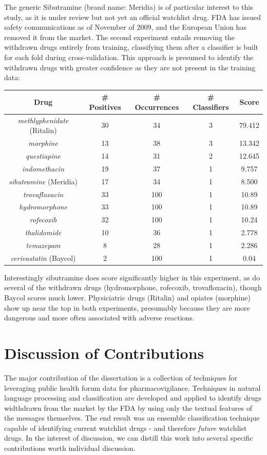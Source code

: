 \documentclass[twoside,11pt]{article}
\begin{document}
The generic Sibutramine (brand name: Meridia) is of particular interest to this study, as it is under review but not yet an official watchlist drug. FDA has issued safety communications as of November of 2009, and the European Union has removed it from the market.
The second experiment entails removing the withdrawn drugs entirely from training, classifying them after a classifier is built for each fold during cross-validation. This approach is presumed to identify the withdrawn drugs with greater confidence as they are not present in the training data:
\begin{center}
  \begin{tabular}{||c c c c c||}
    \hline
    Drug & # Positives & # Occurrences & # Classifiers & Score \\
    \hline\hline
    \textit{methlyphenidate} (Ritalin) & 30 & 34 & 3 & 79.412 \\
    \hline
    \textit{morphine} & 13 & 38 & 3 & 13.342 \\
    \hline
    \textit{questiapine} & 14 & 31 & 2 & 12.645 \\
    \hline
    \textit{indomethacin} & 19 & 37 & 1 & 9.757 \\
    \hline
    \textit{sibutramine} (Meridia) & 17 & 34 & 1 & 8.500\\
    \hline\hline
    \textit{trovafloxacin} & 33 & 100 & 1 & 10.89\\
    \hline
    \textit{hydromorphone} & 33 & 100 & 1 & 10.89\\
    \hline
    \textit{rofecoxib} & 32 & 100 & 1 & 10.24 \\
    \hline
    \textit{thalidomide} & 10 & 36 & 1 & 2.778\\
    \hline
    \textit{temazepam} & 8 & 28 & 1 & 2.286\\
    \hline
    \textit{cerivastatin} (Baycol) & 2 & 100 & 1 & 0.04\\
    \hline
  \end{tabular}
\end{center}
Interestingly sibutramine does score significantly higher in this experiment, as do several of the withdrawn drugs (hydromorphone, rofecoxib, trovafloxacin), though Baycol scores much lower. Physiciatric drugs (Ritalin) and opiates (morphine) show up near the top in both experiments, presumably because they are more dangerous and more often associated with adverse reactions.

\section{Discussion of Contributions}
The major contribution of the dissertation is a collection of techniques for leveraging public health forum data for pharmacovigilance. Techniques in natural language processing and classification are developed and applied to identify drugs widthdrawn from the market by the FDA by using only the textual features of the messages themselves. The end result was an ensemble classification technique capable of identifying current watchlist drugs - and therefore \textit{future} watchlist drugs. In the interest of discussion, we can distill this work into several specific contributions worth individual discussion.
\end{document}
